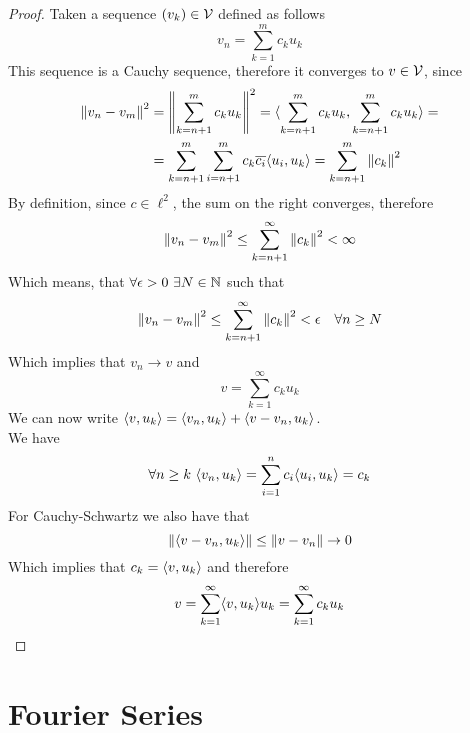 \documentclass[../complete.tex]{subfiles}
\begin{document}
\begin{proof}
	Taken a sequence $(v_k)\in\mathcal{V}$ defined as follows
	\begin{equation*}
		v_n=\sum_{k=1}^{m}c_ku_k
	\end{equation*}
	This sequence is a Cauchy sequence, therefore it converges to $v\in\mathcal{V}$, since
	\begin{equation*}
		\begin{aligned}
			\norm{v_n-v_m}^2&=\norm{\sum_{k=n+1}^{m}c_ku_k}^2=\langle \sum_{k=n+1}^{m}c_ku_k, \sum_{k=n+1}^{m}c_ku_k \rangle=\\
			&=\sum_{k=n+1}^{m}\sum_{i=n+1}^{m}c_k\overline{c_i}\langle u_i, u_k \rangle=\sum^{m}_{k=n+1}\norm{c_k}^2
		\end{aligned}
	\end{equation*}
	By definition, since $c\in\ell^2$, the sum on the right converges, therefore
	\begin{equation*}
		\norm{v_n-v_m}^2\le\sum_{k=n+1}^{\infty}\norm{c_k}^2<\infty
	\end{equation*}
	Which means, that $\forall\epsilon>0\ \exists N\in\N$ such that
	\begin{equation*}
		\norm{v_n-v_m}^2\le\sum_{k=n+1}^{\infty}\norm{c_k}^2<\epsilon\quad\forall n\ge N
	\end{equation*}
	Which implies that $v_n\to v$ and
	\begin{equation*}
		v=\sum_{k=1}^{\infty}c_ku_k
	\end{equation*}
	We can now write $\langle v, u_k \rangle=\langle v_n, u_k \rangle+\langle v-v_n, u_k \rangle$.\\
	We have
	\begin{equation*}
		\forall n\ge k\ \spr{v_n}{u_k}=\sum_{i=1}^{n}c_i\spr{u_i}{u_k}=c_k
	\end{equation*}
	For Cauchy-Schwartz we also have that
	\begin{equation*}
		\norm{\langle v-v_n, u_k \rangle}\le\norm{v-v_n}\to0
	\end{equation*}
	Which implies that $c_k=\langle v, u_k \rangle$ and therefore
	\begin{equation*}
		v=\sum_{k=1}^{\infty}\langle v, u_k \rangle u_k=\sum_{k=1}^{\infty}c_ku_k
	\end{equation*}
\end{proof}
\section{Fourier Series}
\end{document}
